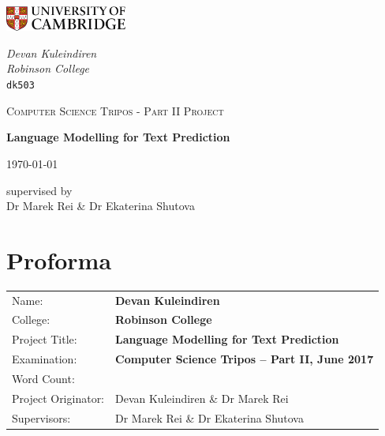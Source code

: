 \documentclass[a4paper, 12pt]{report}
\newcommand\wordcount{}
\begin{document}
\begin{titlepage}
	\noindent
	\begin{minipage}[t][][t]{0.5\textwidth}
		\includegraphics[width=40mm]{./Images/CamLogo.jpg}
	\end{minipage}
	\begin{minipage}{0.5\textwidth}
	\begin{flushright}
		\large
		\textit{Devan Kuleindiren}
		\\
		\textit{Robinson College}
		\\
		\texttt{dk503}
	\end{flushright}
	\end{minipage}
	
	\begin{center}
	\vspace{6cm}
	{\scshape\large Computer Science Tripos - Part II Project\par}
	\vspace{0.5cm}
	{\huge\bfseries Language Modelling for Text Prediction\par}
	\vspace{0.5cm}
	{\large \today \par}
	\end{center}
	
	\vfill
	
	\begin{center}
	supervised by \\
	Dr Marek Rei \& Dr Ekaterina Shutova
	\end{center}
	
	\vspace{1.5cm}
\end{titlepage}


\pagestyle{plain}


\chapter*{Proforma}

{\large
\begin{tabular}{ll}
Name:               & \bf Devan Kuleindiren \\
College:            & \bf Robinson College \\
Project Title:      & \bf Language Modelling for Text Prediction \\
Examination:        & \bf Computer Science Tripos -- Part II, June 2017 \\
Word Count:         & \wordcount \\
Project Originator: & Devan Kuleindiren \& Dr Marek Rei \\
Supervisors:         & Dr Marek Rei \& Dr Ekaterina Shutova \\
\end{tabular}
}
\end{document}
